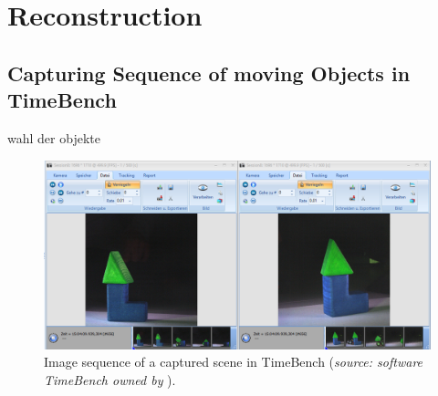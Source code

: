 \section{Reconstruction}\label{sec:Reconstruction}
\subsection{Capturing Sequence of moving Objects in TimeBench}\label{ssec:ReconstrSequence}

wahl der objekte

\begin{figure}[htbp]
		\centering
		\includegraphics[width=1.0\textwidth]{figures/timebenchSequence}
		\caption[Image sequence of a captured scene in TimeBench]{Image sequence of a captured scene in TimeBench (\textit{source: software TimeBench owned by} \cite{Optronis.2016}).}
		\label{fig:timebenchSequence}
\end{figure}